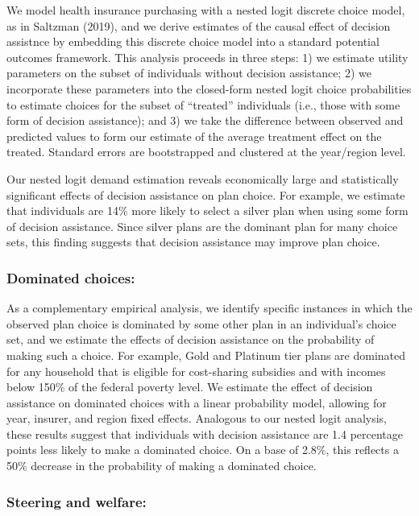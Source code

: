 \documentclass[
  11pt,
]{article}
\begin{document}
We model health insurance purchasing with a nested logit discrete choice model, as in Saltzman (2019), and we derive estimates of the causal effect of decision assistnce by embedding this discrete choice model into a standard potential outcomes framework. This analysis proceeds in three steps: 1) we estimate utility parameters on the subset of individuals without decision assistance; 2) we incorporate these parameters into the closed-form nested logit choice probabilities to estimate choices for the subset of ``treated'' individuals (i.e., those with some form of decision assistance); and 3) we take the difference between observed and predicted values to form our estimate of the average treatment effect on the treated. Standard errors are bootstrapped and clustered at the year/region level.

Our nested logit demand estimation reveals economically large and statistically significant effects of decision assistance on plan choice. For example, we estimate that individuals are 14\% more likely to select a silver plan when using some form of decision assistance. Since silver plans are the dominant plan for many choice sets, this finding suggests that decision assistance may improve plan choice.

\hypertarget{dominated-choices}{%
\subsubsection{Dominated choices:}\label{dominated-choices}}

As a complementary empirical analysis, we identify specific instances in which the observed plan choice is dominated by some other plan in an individual's choice set, and we estimate the effects of decision assistance on the probability of making such a choice. For example, Gold and Platinum tier plans are dominated for any household that is eligible for cost-sharing subsidies and with incomes below 150\% of the federal poverty level. We estimate the effect of decision assistance on dominated choices with a linear probability model, allowing for year, insurer, and region fixed effects. Analogous to our nested logit analysis, these results suggest that individuals with decision assistance are 1.4 percentage points less likely to make a dominated choice. On a base of 2.8\%, this reflects a 50\% decrease in the probability of making a dominated choice.

\hypertarget{steering-and-welfare}{%
\subsubsection{Steering and welfare:}\label{steering-and-welfare}}
\end{document}
